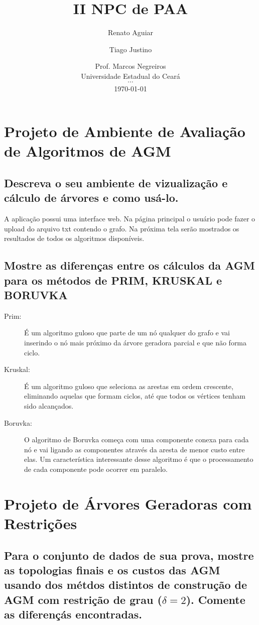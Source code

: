 \documentclass[12pt,a4paper]{article}
\title{II NPC de PAA}
\author{ Renato Aguiar \and Tiago Justino }
\date{
    Prof. Marcos Negreiros \\
	Universidade Estadual do Ceará \\
	$\cdots$ \\
	\today
}
\begin{document}
\maketitle

\section{Projeto de Ambiente de Avaliação de Algoritmos de AGM}
\subsection{Descreva o seu ambiente de vizualização e cálculo de árvores e como
usá-lo.}

A aplicação possui uma interface web. Na página principal o usuário pode fazer
o upload do arquivo txt contendo o grafo. Na próxima tela serão mostrados os
resultados de todos os algoritmos disponíveis.

\subsection{Mostre as diferenças entre os cálculos da AGM para os métodos de
PRIM, KRUSKAL e BORUVKA}

\begin{description}
\item[Prim:] É um algoritmo guloso que parte de um nó qualquer do grafo e vai
inserindo o nó mais próximo da árvore geradora parcial e que não forma ciclo.
\item[Kruskal:] É um algoritmo guloso que seleciona as arestas em ordem crescente,
eliminando aquelas que formam ciclos, até que todos os vértices tenham sido
alcançados.
\item[Boruvka:] O algoritmo de Boruvka começa com uma componente conexa para
cada nó e vai ligando as componentes através da aresta de menor custo entre
elas. Um característica interessante desse algoritmo é que o processamento de
cada componente pode ocorrer em paralelo.
\end{description}

\section{Projeto de Árvores Geradoras com Restrições}

\subsection{Para o conjunto de dados de sua prova, mostre as topologias finais e
os custos das AGM usando dos métdos distintos de construção de AGM com restrição
de grau ($\delta=2$). Comente as diferençás encontradas.}
\end{document}
